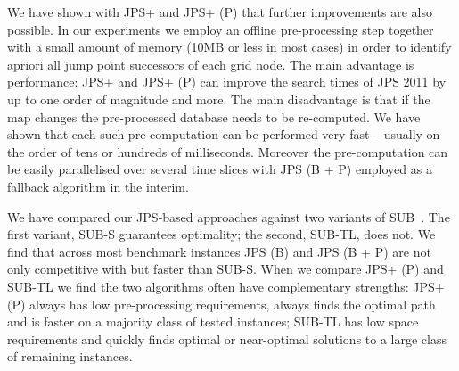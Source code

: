 We have shown with JPS+ and JPS+ (P) that further improvements are also possible. 
In our experiments we employ an offline pre-processing step together with a small 
amount of memory (10MB or less in most cases) in order to identify apriori all jump 
point successors of each grid node.
The main advantage is performance: JPS+ and JPS+ (P) can improve the search times of 
JPS 2011 by up to one order of magnitude and more.
The main disadvantage is that if the map changes the pre-processed
database needs to be re-computed. We have shown that each such pre-computation
can be performed very fast -- usually on the order of tens or hundreds of 
milliseconds. Moreover the pre-computation can be easily parallelised over
several time slices with JPS (B + P) employed as a fallback algorithm in
the interim.

We have compared our JPS-based approaches against two variants of SUB~\cite{urasKH13}.
The first variant, SUB-S guarantees optimality; the second, SUB-TL, does not. 
We find that across most benchmark instances JPS (B) and 
JPS (B + P) are not only competitive with but faster than SUB-S. When we compare
JPS+ (P) and SUB-TL we find the two algorithms often have complementary strengths:
JPS+ (P) always has low pre-processing requirements, always finds the optimal path
and is faster on a majority class of tested instances; SUB-TL has low space
requirements and quickly finds optimal or near-optimal solutions to a large class 
of remaining instances.

